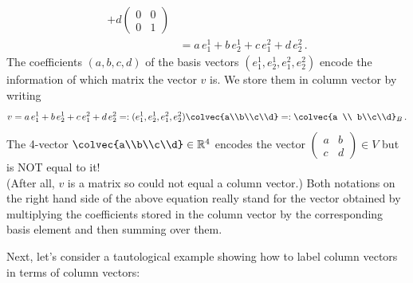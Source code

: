 \begin{example}
\begin{align*}
+d\begin{pmatrix}0&0\\0&1\end{pmatrix}\\[1mm]
&=a\,  e^1_1+b \, e^1_2+c \, e^2_1+d \, e^2_2\, .
\end{align*}
The coefficients $(a,b,c,d)$ of the basis vectors $(e^1_1,e^1_2,e^2_1,e^2_2)$ encode the information of which matrix the vector $v$ is.
We store them in column vector by writing
\[
v=a \, e^1_1+b \, e^1_2+c\,  e^2_1+d \, e^2_2=: (e^1_1,e^1_2,e^2_1,e^2_2)\colvec{a\\b\\c\\d}=:\colvec{a \\ b\\c\\d}_B\, .
\]
The 4-vector $\colvec{a\\b\\c\\d} \in \mathbb{R}^4$ encodes the vector $\begin{pmatrix}a&b\\c&d\end{pmatrix}\in V$ but is NOT equal to it! \\(After all, $v$ is a matrix so could not equal a column vector.) Both notations on the right hand side of the above equation really stand for the vector obtained by multiplying the coefficients stored in the column vector by the corresponding basis element and then summing over them.
\end{example}
 
Next, let's consider a tautological example showing how to label column vectors in terms of column vectors:

